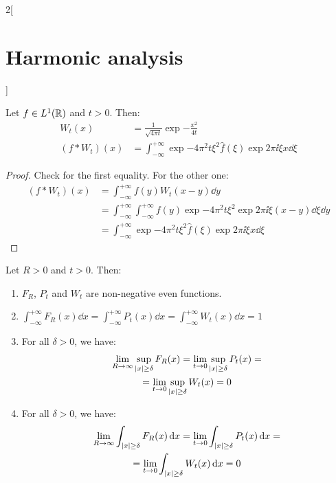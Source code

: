 \documentclass[../../../main_math.tex]{subfiles}
\begin{document}
\begin{multicols}{2}[\section{Harmonic analysis}]
\begin{definition}
  \end{definition}
  \begin{lemma}\label{HA:weierstrassKernel2}
    Let $f\in L^1(\mathbb{R})$ and $t>0$. Then:
    \begin{align*}
      W_t(x)     & =\frac{1}{\sqrt{4\pi t}}\exp{-\frac{x^2}{4t}}                                           \\
      (f*W_t)(x) & =\int_{-\infty}^{+\infty}\exp{-4\pi^2 t\xi^2}\widehat{f}(\xi)\exp{2\pi\ii\xi x}\dd{\xi}
    \end{align*}
  \end{lemma}
  \begin{proof}
    Check  for the first equality. For the other one:
    \begin{align*}
      (f*W_t)(x) & =\int_{-\infty}^{+\infty}f(y)W_t(x-y)\dd{y}                                                                    \\
                 & =\int_{-\infty}^{+\infty}\int_{-\infty}^{+\infty}f(y)\exp{-4\pi^2 t\xi^2}\exp{2\pi\ii \xi (x-y)}\dd{\xi}\dd{y} \\
                 & =\int_{-\infty}^{+\infty}\exp{-4\pi^2 t\xi^2}\widehat{f}(\xi)\exp{2\pi\ii\xi x}\dd{\xi}
    \end{align*}
  \end{proof}
  \begin{proposition}
    Let $R>0$ and $t>0$. Then:
    \begin{enumerate}
      \item $F_R$, $P_t$ and $W_t$ are non-negative even functions.
      \item $\int_{-\infty}^{+\infty}F_R(x)\dd{x}=\int_{-\infty}^{+\infty}P_t(x)\dd{x}=\int_{-\infty}^{+\infty}W_t(x)\dd{x}=1$
      \item For all $\delta>0$, we have:
            \begin{multline*}
              \lim_{R\to \infty}\sup_{\abs{x}\geq \delta}F_R(x)=\lim_{t\to 0}\sup_{\abs{x}\geq \delta}P_t(x)=\\=\lim_{t\to 0}\sup_{\abs{x}\geq \delta}W_t(x)=0
            \end{multline*}
            \item\label{HA:propsKernelsitem4} For all $\delta>0$, we have:
            \begin{multline*}
              \lim_{R\to \infty}\int_{\abs{x}\geq \delta}F_R(x)\dd{x}=\lim_{t\to 0}\int_{\abs{x}\geq \delta}P_t(x)\dd{x}=\\=\lim_{t\to 0}\int_{\abs{x}\geq \delta}W_t(x)\dd{x}=0

\end{multline*}
\end{enumerate}
\end{proposition}
\end{multicols}
\end{document}
